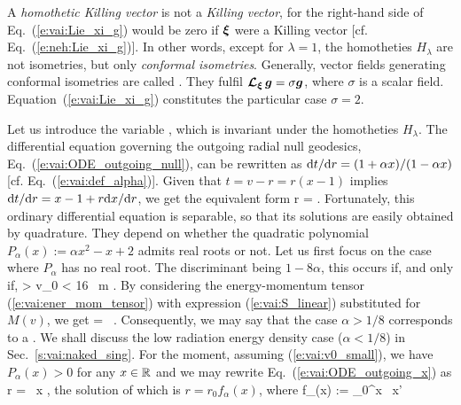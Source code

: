 \begin{remark}
A \emph{homothetic Killing vector} is not a \emph{Killing vector},
for the right-hand side of Eq.~(\ref{e:vai:Lie_xi_g}) would be zero if
$\bm{\xi}$ were a Killing vector [cf. Eq.~(\ref{e:neh:Lie_xi_g})].
In other words, except for $\lambda=1$, the homotheties $H_\lambda$ are not isometries,
but only \emph{conformal isometries}.
Generally, vector fields generating conformal isometries are
called .
They fulfil $\bm{\mathcal{L}}_{\bm{\xi}}\, \bm{g} = \sigma \bm{g}$, where $\sigma$ is a scalar field.
Equation~(\ref{e:vai:Lie_xi_g}) constitutes the particular case $\sigma = 2$.
\end{remark}

Let us introduce the variable
\be \label{e:vai:def_x_v_r}
    ,
\ee
which is invariant under the homotheties $H_\lambda$.
The differential equation governing the outgoing radial null
geodesics, Eq.~(\ref{e:vai:ODE_outgoing_null}),
can be rewritten as $\mathrm{d} t / \mathrm{d} r = (1 + \alpha x)/(1 - \alpha x)$ [cf. Eq.~(\ref{e:vai:def_alpha})].
Given that $t = v - r = r(x - 1)$ implies $\mathrm{d} t / \mathrm{d} r = x - 1 + r \mathrm{d} x/\mathrm{d} r$,
we get the equivalent form
\be \label{e:vai:ODE_outgoing_x}
    r  =  .
\ee
Fortunately, this ordinary differential equation is separable, so that its
solutions are easily obtained by quadrature. They depend on whether the
quadratic polynomial $P_\alpha(x) := \alpha x^2 - x + 2$ admits real roots
or not.
Let us first focus on the case where $P_\alpha$ has no real root.
The discriminant being $1 - 8\alpha$, this occurs if, and only if,
\be \label{e:vai:v0_small}
    \alpha >  \iff v_0 < 16 \, m .
\ee
By considering the energy-momentum tensor (\ref{e:vai:ener_mom_tensor}) with
expression (\ref{e:vai:S_linear}) substituted for $M(v)$, we get
\be \label{e:vai:T_alpha}
 = \,  \otimes {} .
\ee
Consequently, we may say that the case $\alpha > 1/8$
corresponds to
a .
We shall discuss the low radiation energy density case
($\alpha < 1/8$)
in Sec.~\ref{s:vai:naked_sing}.
For the moment, assuming (\ref{e:vai:v0_small}),
we have $P_\alpha(x) > 0$ for any $x\in\mathbb{R}$ and we may rewrite Eq.~(\ref{e:vai:ODE_outgoing_x})
as
\be \label{e:vai:ODE_outgoing_x_sep}
    \D \ln r = \, \D x ,
\ee
the solution of which is $r = r_0 f_\alpha(x)$, where
\be \label{e:vai:lnf_alpha}
    \ln f_\alpha(x) := \int_0^x \, \D x'
